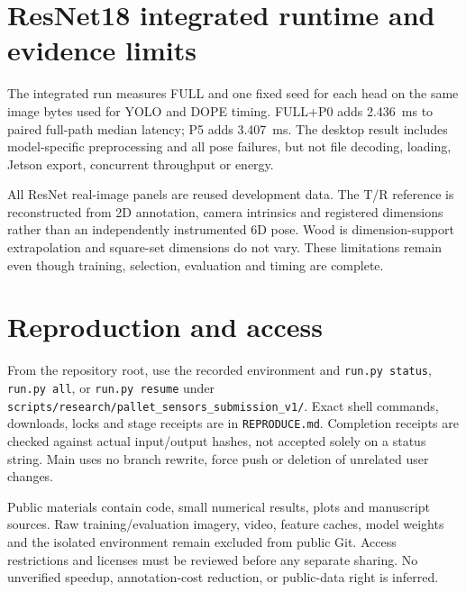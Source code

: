 \documentclass[10pt]{article}
\begin{document}
\section{ResNet18 integrated runtime and evidence limits}

The integrated run measures FULL and one fixed seed for each head on the same image bytes used for YOLO and DOPE timing. FULL+P0 adds 2.436~ms to paired full-path median latency; P5 adds 3.407~ms. The desktop result includes model-specific preprocessing and all pose failures, but not file decoding, loading, Jetson export, concurrent throughput or energy.

All ResNet real-image panels are reused development data. The T/R reference is reconstructed from 2D annotation, camera intrinsics and registered dimensions rather than an independently instrumented 6D pose. Wood is dimension-support extrapolation and square-set dimensions do not vary. These limitations remain even though training, selection, evaluation and timing are complete.

\section{Reproduction and access}
From the repository root, use the recorded environment and \texttt{run.py status}, \texttt{run.py all}, or \texttt{run.py resume} under \texttt{scripts/research/pallet\_sensors\_submission\_v1/}. Exact shell commands, downloads, locks and stage receipts are in \texttt{REPRODUCE.md}. Completion receipts are checked against actual input/output hashes, not accepted solely on a status string. Main uses no branch rewrite, force push or deletion of unrelated user changes.

Public materials contain code, small numerical results, plots and manuscript sources. Raw training/evaluation imagery, video, feature caches, model weights and the isolated environment remain excluded from public Git. Access restrictions and licenses must be reviewed before any separate sharing. No unverified speedup, annotation-cost reduction, or public-data right is inferred.
\end{document}
